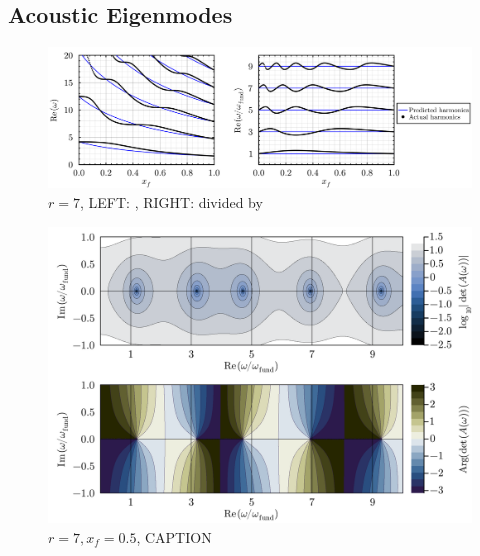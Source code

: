 \subsection{Acoustic Eigenmodes}


\begin{figure}[t]
\centering
\includegraphics[scale=0.35]{assets/graphs/r=7_harmonics_both.pdf}
\caption{$r = 7$, LEFT: , RIGHT: divided by }
\label{fig:flame-harmonics}
\end{figure}

\begin{figure}[t]
\centering
\includegraphics[scale=0.35]{assets/graphs/r=7_xf=05_complex_harmonics.pdf}
\caption{$r = 7, x_f = 0.5$, CAPTION}
\label{fig:flame-harmonics-complex}
\end{figure}


